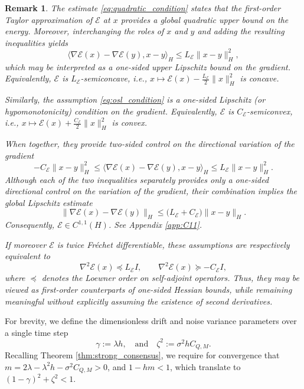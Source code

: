 \documentclass[12pt]{amsart}
\numberwithin{equation}{section}
\newtheorem{remark}[theorem]{Remark}
\begin{document}
\begin{remark}\label{rmk:interpretation}
The estimate \eqref{eq:quadratic_condition} states that the first-order Taylor approximation of $\mathscr{E}$ at $x$ provides a global quadratic upper bound on the energy. Moreover, interchanging the roles of $x$ and $y$ and adding the resulting inequalities yields
\[
\langle \nabla\mathscr{E}(x)-\nabla\mathscr{E}(y), x-y \rangle_H \le L_{\mathscr{E}}\|x-y\|_H^2,
\]
which may be interpreted as a one-sided upper Lipschitz bound on the gradient. Equivalently, $\mathscr{E}$ is $L_{\mathscr{E}}$-semiconcave, i.e., $x\mapsto \mathscr{E}(x)-\frac{L_{\mathscr{E}}}{2}\|x\|_H^2$ is concave.

Similarly, the assumption \eqref{eq:osl_condition} is a one-sided Lipschitz (or hypomonotonicity) condition on the gradient. Equivalently, $\mathscr{E}$ is $C_{\mathscr{E}}$-semiconvex, i.e., $x\mapsto \mathscr{E}(x)+\frac{C_{\mathscr{E}}}{2}\|x\|_H^2$ is convex. 

When together, they provide two-sided control on the directional variation of the gradient
\[
-C_{\mathscr{E}}\|x-y\|_H^2 \le \langle \nabla\mathscr{E}(x)-\nabla\mathscr{E}(y), x-y \rangle_H \le L_{\mathscr{E}}\|x-y\|_H^2.
\]
Although each of the two inequalities separately provides only a one-sided directional control on the variation of the gradient, their combination implies the global Lipschitz estimate
\[
\|\nabla\mathscr{E}(x)-\nabla\mathscr{E}(y)\|_H \le \bigl(L_{\mathscr{E}}+C_{\mathscr{E}}\bigr)\|x-y\|_H.
\]
Consequently, $\mathscr{E}\in C^{1,1}(H)$. See Appendix \ref{app:C11}. 

If moreover $\mathscr{E}$ is twice Fr\'echet differentiable, these assumptions are respectively equivalent to
\[
\nabla^2\mathscr{E}(x)\preceq L_{\mathscr{E}}I, \qquad \nabla^2\mathscr{E}(x)\succeq -C_{\mathscr{E}}I,
\]
where $\preceq$ denotes the Loewner order on self-adjoint operators. Thus, they may be viewed as first-order counterparts of one-sided Hessian bounds, while remaining meaningful without explicitly assuming the existence of second derivatives.
\end{remark}



For brevity, we define the dimensionless drift and noise variance parameters over a single time step
\begin{equation*}
    \gamma := \lambda h, \quad \text{and} \quad \zeta^2 := \sigma^2 h C_{Q,M}.
\end{equation*}
Recalling Theorem \ref{thm:strong_consensus}, we require for convergence that $m = 2\lambda - \lambda^2 h - \sigma^2 C_{Q,M} > 0$, and $1-hm<1$, which translate to $(1-\gamma)^2 + \zeta^2 < 1$. 
\end{document}
